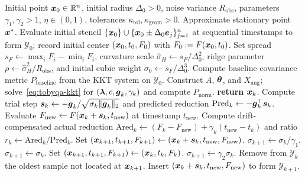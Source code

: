 \begin{algorithm}[t]
\caption{TOBYQA}
\label{alg:tobyqa}
\begin{algorithmic}[1]
\REQUIRE Initial point $\boldsymbol{x}_0\in\mathbb{R}^n$, initial radius $\Delta_0>0$, noise variance $R_{\mathrm{obs}}$, parameters $\gamma_1,\gamma_2>1$, $\eta\in(0,1)$, tolerances $\kappa_{\mathrm{tol}},\kappa_{\mathrm{geom}}>0$.
\ENSURE Approximate stationary point $\boldsymbol{x}^*$.
\STATE Evaluate initial stencil $\{\boldsymbol{x}_0\}\cup\{\boldsymbol{x}_0\pm\Delta_0\boldsymbol{e}_j\}_{j=1}^n$ at sequential timestamps to form $\mathcal Y_0$; record initial center $(\boldsymbol{x}_0, t_0, F_0)$ with $F_0 := F(\boldsymbol{x}_0, t_0)$.
\STATE Set spread $s_F\leftarrow\max_iF_i-\min_iF_i$, curvature scale $\widehat\sigma_H\leftarrow s_F/\Delta_0^2$, ridge parameter $\rho\leftarrow \widehat\sigma_H^2/R_{\mathrm{obs}}$, and initial cubic weight $\sigma_0\leftarrow s_F/\Delta_0^3$.
\STATE Compute baseline covariance metric $P_{\mathrm{baseline}}$ from the KKT system on $\mathcal Y_0$.
  \STATE Construct $A$, $\boldsymbol{\theta}$, and $X_{\mathrm{aug}}$; solve~\eqref{eq:tobyqa-kkt} for $(\boldsymbol{\lambda},c,\boldsymbol{g}_k,\gamma_k)$ and compute $P_{\mathrm{norm}}$.
    \STATE \textbf{return} $\boldsymbol{x}_k$.
  \ENDIF
  \STATE Compute trial step $\boldsymbol{s}_k\leftarrow-\boldsymbol{g}_k/\sqrt{\sigma_k\|\boldsymbol{g}_k\|_2}$ and predicted reduction $\mathrm{Pred}_k\leftarrow-\boldsymbol{g}_k^\top \boldsymbol{s}_k$.
  \STATE Evaluate $F_{\mathrm{new}} \leftarrow F(\boldsymbol{x}_k+\boldsymbol{s}_k, t_{\mathrm{new}})$ at timestamp $t_{\mathrm{new}}$.
  \STATE Compute drift-compensated actual reduction $\mathrm{Ared}_k\leftarrow (F_k-F_{\mathrm{new}})+\gamma_k(t_{\mathrm{new}}-t_k)$ and ratio $r_k\leftarrow\mathrm{Ared}_k/\mathrm{Pred}_k$.
    \STATE Set $(\boldsymbol{x}_{k+1}, t_{k+1}, F_{k+1}) \leftarrow (\boldsymbol{x}_k+\boldsymbol{s}_k, t_{\mathrm{new}}, F_{\mathrm{new}})$.
      \STATE $\sigma_{k+1}\leftarrow\sigma_k/\gamma_1$.
    \ELSE
      \STATE $\sigma_{k+1}\leftarrow\sigma_k$.
    \ENDIF
  \ELSE
    \STATE Set $(\boldsymbol{x}_{k+1}, t_{k+1}, F_{k+1}) \leftarrow (\boldsymbol{x}_k, t_k, F_k)$.
    \STATE $\sigma_{k+1}\leftarrow\gamma_2\sigma_k$.
  \ENDIF
  \STATE Remove from $\mathcal Y_k$ the oldest sample not located at $\boldsymbol{x}_{k+1}$.
  \STATE Insert $(\boldsymbol{x}_k+\boldsymbol{s}_k,t_{\mathrm{new}},F_{\mathrm{new}})$ to form $\mathcal Y_{k+1}$.
\ENDFOR
\end{algorithmic}
\end{algorithm}
